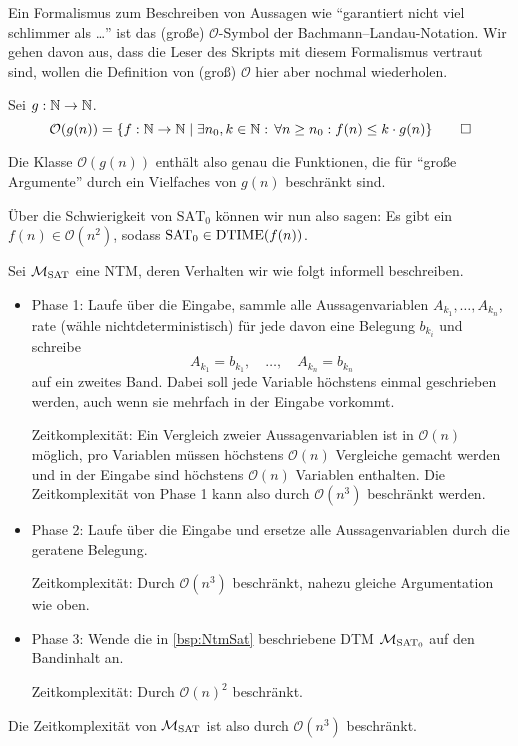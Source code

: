Ein Formalismus zum Beschreiben von Aussagen wie "`garantiert nicht viel schlimmer als \dots"'
ist das (große) $\mathcal{O}$-Symbol der Bachmann–Landau-Notation.
Wir gehen davon aus, dass die Leser des Skripts mit diesem Formalismus vertraut sind, wollen die Definition von (groß) $\mathcal{O}$ hier aber nochmal wiederholen.

\begin{Def} Sei $g:\mathbb{N}\rightarrow\mathbb{N}$.
\[ \mathcal{O}(g(n)) = \{f:\mathbb{N}\rightarrow\mathbb{N} \mid \exists n_0, k\in\mathbb{N}:\, \forall n\geq n_0: f(n)\leq k\cdot g(n)\} \qedhere \]
\end{Def}
Die Klasse $\mathcal{O}(g(n))$ enthält also genau die Funktionen, die für "`große Argumente"' durch ein Vielfaches von $g(n)$ beschränkt sind.

Über die Schwierigkeit von $\text{SAT}_0$ können wir nun also sagen:
Es gibt ein $f(n)\in\mathcal{O}(n^2)$, sodass $\text{SAT}_0\in\operatorname{DTIME}(f(n))$.

\begin{Bsp}\label{bsp:NtmSat}
Sei $\mathcal{M}_\text{SAT}$ eine \ac{NTM}, deren Verhalten wir wie folgt informell beschreiben.
\begin{itemize}
 \item Phase 1: Laufe über die Eingabe, sammle alle Aussagenvariablen $A_{k_1},\ldots,A_{k_n}$, rate (wähle nichtdeterministisch) für jede davon eine Belegung $b_{k_i}$ und schreibe
 $$A_{k_1}=b_{k_1},\quad\ldots,\quad A_{k_n}=b_{k_n}$$
 auf ein zweites Band.
 Dabei soll jede Variable höchstens einmal geschrieben werden, auch wenn sie mehrfach in der Eingabe vorkommt.
  
 Zeitkomplexität: 
 Ein Vergleich zweier Aussagenvariablen ist in $\mathcal{O}(n)$ möglich,
 pro Variablen müssen höchstens $\mathcal{O}(n)$ Vergleiche gemacht werden und
 in der Eingabe sind höchstens $\mathcal{O}(n)$ Variablen enthalten.
 Die Zeitkomplexität von Phase 1 kann also durch $\mathcal{O}(n^3)$ beschränkt werden.
 
 \item Phase 2: Laufe über die Eingabe und ersetze alle Aussagenvariablen durch die geratene Belegung.
 
 Zeitkomplexität: Durch $\mathcal{O}(n^3)$ beschränkt, nahezu gleiche Argumentation wie oben.
 
 \item Phase 3: Wende die in \autoref{bsp:NtmSat} beschriebene \ac{DTM} $\mathcal{M}_{\text{SAT}_0}$ auf den Bandinhalt an.
 
 Zeitkomplexität: Durch $\mathcal{O}(n)^2$ beschränkt.
\end{itemize}
Die Zeitkomplexität von $\mathcal{M}_\text{SAT}$ ist also durch $\mathcal{O}(n^3)$ beschränkt.
\end{Bsp}


